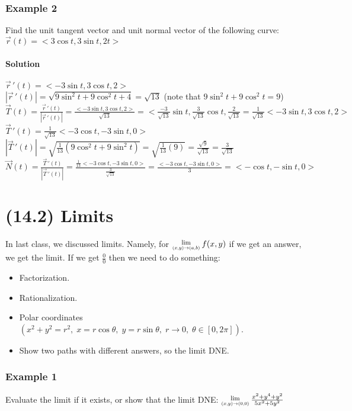 \documentclass{article}
\newcommand{\Lim}[1]{\raisebox{0.5ex}{\scalebox{0.8}{$\displaystyle \lim_{#1}\;$}}}
\begin{document}
\subsubsection{Example 2}
Find the unit tangent vector and unit normal vector of the following curve: $\vec{r}(t)=<3\cos{t},3\sin{t},2t>$
\paragraph{Solution} $\vec{r}\,'(t)=<-3\sin{t},3\cos{t},2>$
\\$|\vec{r}\,'(t)|=\sqrt{9\sin^2t+9\cos^2t+4}=\sqrt{13}$ (note that $9\sin^2t+9\cos^2t=9$)
\\$\vec{T}(t)=\frac{\vec{r}\,'(t)}{|\vec{r}\,'(t)|}=\frac{<-3\sin{t},3\cos{t},2>}{\sqrt{13}}=<\frac{-3}{\sqrt{13}}\sin{t},\frac{3}{\sqrt{13}}\cos{t},\frac{2}{\sqrt{13}}=\frac{1}{\sqrt{13}}<-3\sin{t},3\cos{t},2>$
\\$\vec{T}\,'(t)=\frac{1}{\sqrt{13}}<-3\cos{t},-3\sin{t},0>$
\\$|\vec{T}\,'(t)|=\sqrt{\frac{1}{13}\left(9\cos^2t+9\sin^2t\right)}=\sqrt{\frac{1}{13}(9)}=\frac{\sqrt{9}}{\sqrt{13}}=\frac{3}{\sqrt{13}}$
\\$\vec{N}(t)=\frac{\vec{T}\,'(t)}{|\vec{T}\,'(t)|}=\frac{\frac{1}{13}<-3\cos{t},-3\sin{t},0>}{\frac{3}{\sqrt{13}}}=\frac{<-3\cos{t},-3\sin{t},0>}{3}=<-\cos{t},-\sin{t},0>$

\newpage
\section{(14.2) Limits}
In last class, we discussed limits. Namely, for $\Lim{(x,y)\to(a,b)}f(x,y)$ if we get an answer, we get the limit.
If we get $\frac{0}{0}$ then we need to do something:
\begin{itemize}
    \itemsep 0em
    \item Factorization.
    \item Rationalization.
    \item Polar coordinates $\left(x^2+y^2=r^2,\;x=r\cos\theta,\;y=r\sin\theta,\;r\to0,\;\theta\in[0,2\pi]\right)$.
    \item Show two paths with different answers, so the limit DNE.
\end{itemize}
\subsubsection{Example 1}
Evaluate the limit if it exists, or show that the limit DNE: $\Lim{(x,y)\to(0,0)}\frac{x^2+y^4+y^2}{5x^2+5y^2}$
\end{document}
